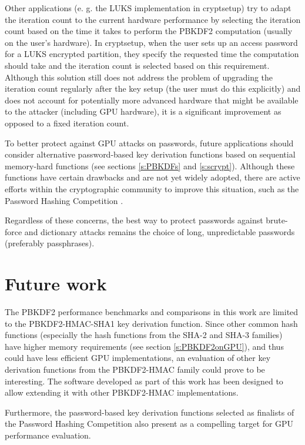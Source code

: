 \documentclass[12pt,oneside]{fithesis2}
\begin{document}
      Other applications (e. g. the LUKS implementation in cryptsetup) try to adapt the iteration count to the current hardware performance by selecting the iteration count based on the time it takes to perform the PBKDF2 computation (usually on the user's hardware). In cryptsetup, when the user sets up an access password for a LUKS encrypted partition, they specify the requested time the computation should take and the iteration count is selected based on this requirement. Although this solution still does not address the problem of upgrading the iteration count regularly after the key setup (the user must do this explicitly) and does not account for potentially more advanced hardware that might be available to the attacker (including GPU hardware), it is a significant improvement as opposed to a fixed iteration count.
      
      To better protect against GPU attacks on passwords, future applications should consider alternative password-based key derivation functions based on sequential memory-hard functions (see sections \ref{s:PBKDFs} and \ref{s:scrypt}). Although these functions have certain drawbacks and are not yet widely adopted, there are active efforts within the cryptographic community to improve this situation, such as the Password Hashing Competition \cite{phc}.
      
      Regardless of these concerns, the best way to protect passwords against brute-force and dictionary attacks remains the choice of long, unpredictable passwords (preferably passphrases).
      
      \section{Future work}
      The PBKDF2 performance benchmarks and comparisons in this work are limited to the PBKDF2-HMAC-SHA1 key derivation function. Since other common hash functions (especially the hash functions from the SHA-2 and SHA-3 families) have higher memory requirements (see section \ref{s:PBKDF2onGPU}), and thus could have less efficient GPU implementations, an evaluation of other key derivation functions from the PBKDF2-HMAC family could prove to be interesting. The software developed as part of this work has been designed to allow extending it with other PBKDF2-HMAC implementations.
      
      Furthermore, the password-based key derivation functions selected as finalists of the Password Hashing Competition \cite{phc} also present as a compelling target for GPU performance evaluation.
      
\end{document}
